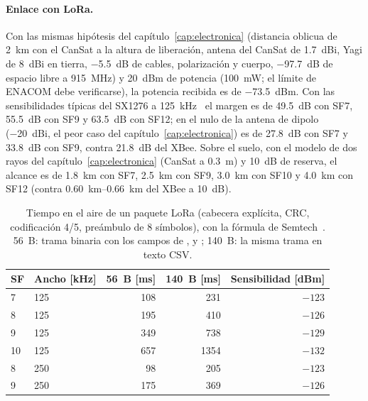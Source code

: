\paragraph{Enlace con LoRa.} Con las mismas hipótesis del capítulo~\ref{cap:electronica}
(distancia oblicua de \SI{2}{km} con el CanSat a la altura de liberación, antena del CanSat de
\SI{1.7}{dBi}, Yagi de \SI{8}{dBi} en tierra, \SI{-5.5}{dB} de cables, polarización y cuerpo,
\SI{-97.7}{dB} de espacio libre a \SI{915}{MHz}) y \SI{20}{dBm} de potencia (\SI{100}{mW}; el
límite de ENACOM debe verificarse), la potencia recibida es de \SI{-73.5}{dBm}. Con las
sensibilidades típicas del SX1276\nv{} a \SI{125}{kHz}~\cite{sensores-an1200} el margen es de
\SI{49.5}{dB} con SF7, \SI{55.5}{dB} con SF9 y \SI{63.5}{dB} con SF12; en el nulo de la antena de
dipolo (\SI{-20}{dBi}, el peor caso del capítulo~\ref{cap:electronica}) es de \SI{27.8}{dB} con
SF7 y \SI{33.8}{dB} con SF9, contra \SI{21.8}{dB} del XBee. Sobre el suelo, con el modelo de dos
rayos del capítulo~\ref{cap:electronica} (CanSat a \SI{0.3}{m}) y \SI{10}{dB} de reserva, el
alcance es de \SI{1.8}{km} con SF7, \SI{2.5}{km} con SF9, \SI{3.0}{km} con SF10 y \SI{4.0}{km} con
SF12 (contra \SIrange{0.60}{0.66}{km} del XBee a \SI{10}{dB}).

\begin{table}[H]
\centering\small
\caption{Tiempo en el aire de un paquete LoRa (cabecera explícita, CRC, codificación 4/5,
preámbulo de 8 símbolos), con la fórmula de Semtech~\cite{sensores-an1200}. 56~B: trama binaria
con los campos de ,  y ; 140~B: la misma trama en texto CSV.}\label{tab:sens-lora}
\begin{tabular}{@{}llrrr@{}}
\toprule
\textbf{SF} & \textbf{Ancho} [kHz] & \textbf{56~B} [ms] & \textbf{140~B} [ms] & \textbf{Sensibilidad} [dBm]\\\midrule
7 & 125 & 108 & 231 & $-123$\\
8 & 125 & 195 & 410 & $-126$\\
9 & 125 & 349 & 738 & $-129$\\
10 & 125 & 657 & 1354 & $-132$\\
8 & 250 & 98 & 205 & $-123$\\
9 & 250 & 175 & 369 & $-126$\\
\bottomrule
\end{tabular}
\end{table}

